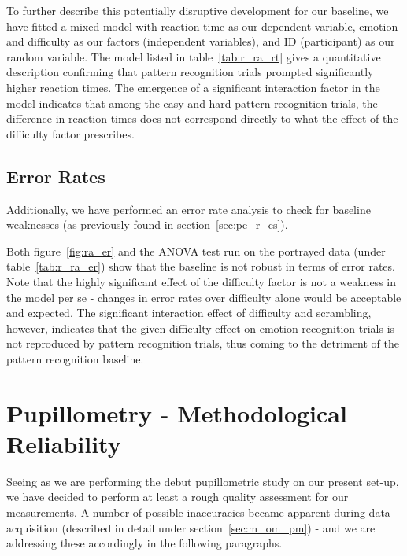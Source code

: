 	    To further describe this potentially disruptive development for our baseline, we have fitted a mixed model with reaction time as our dependent variable, emotion and difficulty as our factors (independent variables), and ID (participant) as our random variable.
	    The model listed in table~\ref{tab:r_ra_rt} gives a quantitative description confirming that pattern recognition trials prompted significantly higher reaction times.
	    The emergence of a significant interaction factor in the model indicates that among the easy and hard pattern recognition trials, the difference in reaction times does not correspond directly to what the effect of the difficulty factor prescribes.
	\subsection{Error Rates}\label{sec:r_ra_er}
	    Additionally, we have performed an error rate analysis to check for baseline weaknesses (as previously found in section~\ref{sec:pe_r_cs}).
	    
	    Both figure~\ref{fig:ra_er} and the ANOVA test run on the portrayed data (under table~\ref{tab:r_ra_er}) show that the baseline is not robust in terms of error rates.
	    Note that the highly significant effect of the difficulty factor is not a weakness in the model per se - changes in error rates over difficulty alone would be acceptable and expected.
	    The significant interaction effect of difficulty and scrambling, however, indicates that the given difficulty effect on emotion recognition trials is not reproduced by pattern recognition trials, thus coming to the detriment of the pattern recognition baseline.	    
    
    \section{Pupillometry - Methodological Reliability}\label{sec:r_p}
	Seeing as we are performing the debut pupillometric study on our present set-up, we have decided to perform at least a rough quality assessment for our measurements.
	A number of possible inaccuracies became apparent during data acquisition (described in detail under section~\ref{sec:m_om_pm}) - 
	and we are addressing these accordingly in the following paragraphs.
	
